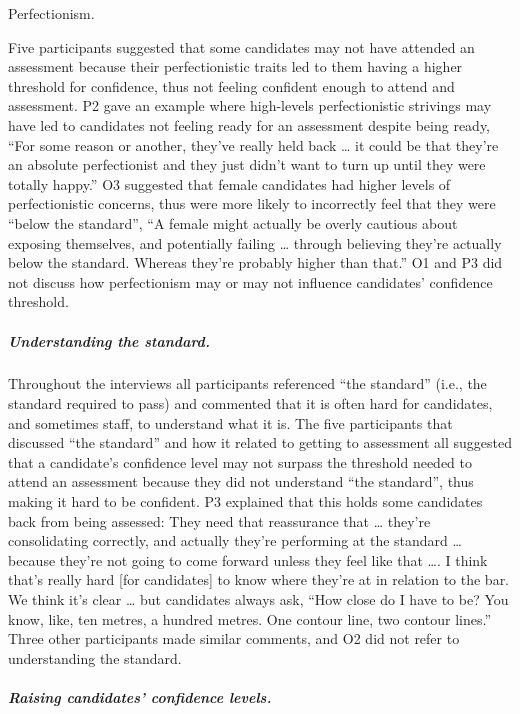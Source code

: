 \documentclass[a4paper,]{book}
\let\oldsubparagraph\subparagraph
\renewcommand{\subparagraph}[1]{\oldsubparagraph{#1}\mbox{}}
\begin{document}
Perfectionism.

Five participants suggested that some candidates may not have attended an assessment because their perfectionistic traits led to them having a higher threshold for confidence, thus not feeling confident enough to attend and assessment. P2 gave an example where high-levels perfectionistic strivings may have led to candidates not feeling ready for an assessment despite being ready, ``For some reason or another, they've really held back \ldots{} it could be that they're an absolute perfectionist and they just didn't want to turn up until they were totally happy.''
O3 suggested that female candidates had higher levels of perfectionistic concerns, thus were more likely to incorrectly feel that they were ``below the standard'', ``A female might actually be overly cautious about exposing themselves, and potentially failing \ldots{} through believing they're actually below the standard. Whereas they're probably higher than that.''
O1 and P3 did not discuss how perfectionism may or may not influence candidates' confidence threshold.

\hypertarget{understanding-the-standard.}{%
\subparagraph{Understanding the standard.}\label{understanding-the-standard.}}

Throughout the interviews all participants referenced ``the standard'' (i.e., the standard required to pass) and commented that it is often hard for candidates, and sometimes staff, to understand what it is. The five participants that discussed ``the standard'' and how it related to getting to assessment all suggested that a candidate's confidence level may not surpass the threshold needed to attend an assessment because they did not understand ``the standard'', thus making it hard to be confident. P3 explained that this holds some candidates back from being assessed:
They need that reassurance that \ldots{} they're consolidating correctly, and actually they're performing at the standard \ldots{} because they're not going to come forward unless they feel like that \ldots{}. I think that's really hard {[}for candidates{]} to know where they're at in relation to the bar. We think it's clear \ldots{} but candidates always ask, ``How close do I have to be? You know, like, ten metres, a hundred metres. One contour line, two contour lines.''
Three other participants made similar comments, and O2 did not refer to understanding the standard.

\hypertarget{raising-candidates-confidence-levels.}{%
\subparagraph{Raising candidates' confidence levels.}\label{raising-candidates-confidence-levels.}}
\end{document}
